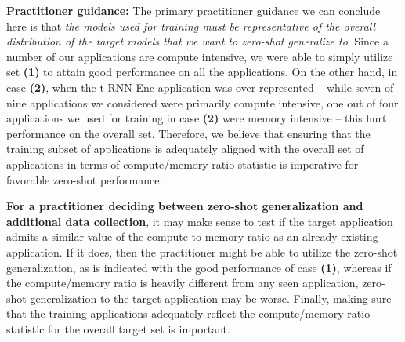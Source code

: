 {\textbf{Practitioner guidance:} The primary practitioner guidance we can conclude here is that \emph{the models used for training must be representative of the overall distribution of the target models that we want to zero-shot generalize to}. Since a number of our applications are compute intensive, we were able to simply utilize set \textbf{(1)} to attain good performance on all the applications. On the other hand, in case \textbf{(2)}, when the t-RNN Enc application was over-represented -- while seven of nine applications we considered were primarily compute intensive, one out of four applications we used for training in case \textbf{(2)} were memory intensive -- this hurt performance on the overall set.
%
Therefore, we believe that ensuring that the training subset of applications is adequately aligned with the overall set of applications in terms of compute/memory ratio statistic is imperative for favorable zero-shot performance.}

{\textbf{For a practitioner deciding between zero-shot generalization and additional data collection}, it may make sense to test if the target application admits a similar value of the compute to memory ratio as an already existing application. If it does, then the practitioner might be able to utilize the zero-shot generalization, as is indicated with the good performance of case \textbf{(1)}, whereas if the compute/memory ratio is heavily different from any seen application, zero-shot generalization to the target application may be worse. Finally, making sure that the training applications adequately reflect the compute/memory ratio statistic for the overall target set is important.}
